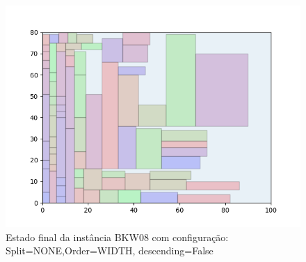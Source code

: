 \begin{figure}[H]
    \centering
    \caption[]{Estado final da instância BKW08 com configuração: Split=NONE,Order=WIDTH, descending=False}
    \label{fig:bkw08-none-width-false}
    \includegraphics[scale=0.5]{output/figures/bkw/bkw08/none/width/false/00}
\end{figure}